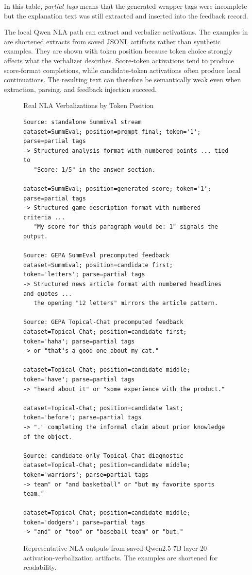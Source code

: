 \documentclass[12pt,a4paper,twoside,openright]{book}
\begin{document}
In this table, \textit{partial tags} means that the generated wrapper tags were
incomplete but the explanation text was still extracted and inserted into the
feedback record.

The local Qwen NLA path can extract and verbalize activations. The examples in
 are shortened extracts from saved JSONL
artifacts rather than synthetic examples. They are shown with token position
because token choice strongly affects what the verbalizer describes. Score-token
activations tend to produce score-format completions, while candidate-token
activations often produce local continuations. The resulting text can therefore
be semantically weak even when extraction, parsing, and feedback injection
succeed.

\begin{figure}[!htb]
    \centering
    \begin{thesispromptbox}[width=0.98\linewidth]{Real NLA Verbalizations by Token Position}
\begin{Verbatim}[fontsize=\scriptsize]
Source: standalone SummEval stream
dataset=SummEval; position=prompt final; token='1'; parse=partial tags
-> Structured analysis format with numbered points ... tied to
   "Score: 1/5" in the answer section.

dataset=SummEval; position=generated score; token='1'; parse=partial tags
-> Structured game description format with numbered criteria ...
   "My score for this paragraph would be: 1" signals the output.

Source: GEPA SummEval precomputed feedback
dataset=SummEval; position=candidate first; token='letters'; parse=partial tags
-> Structured news article format with numbered headlines and quotes ...
   the opening "12 letters" mirrors the article pattern.

Source: GEPA Topical-Chat precomputed feedback
dataset=Topical-Chat; position=candidate first; token='haha'; parse=partial tags
-> or "that's a good one about my cat."

dataset=Topical-Chat; position=candidate middle; token='have'; parse=partial tags
-> "heard about it" or "some experience with the product."

dataset=Topical-Chat; position=candidate last; token='before'; parse=partial tags
-> "." completing the informal claim about prior knowledge of the object.

Source: candidate-only Topical-Chat diagnostic
dataset=Topical-Chat; position=candidate middle; token='warriors'; parse=partial tags
-> team" or "and basketball" or "but my favorite sports team."

dataset=Topical-Chat; position=candidate middle; token='dodgers'; parse=partial tags
-> "and" or "too" or "baseball team" or "but."
\end{Verbatim}
    \end{thesispromptbox}
    \caption{Representative NLA outputs from saved Qwen2.5-7B layer-20
    activation-verbalization artifacts. The examples are shortened for
    readability.}
    \label{fig:nla-verbalization-example}
\end{figure}
\end{document}
